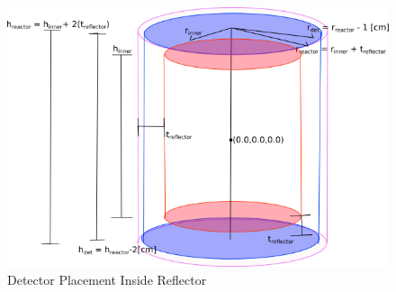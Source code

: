 \begin{figure}[h!]
\centering
\includegraphics{figures/detector-layout.png}
\caption{Detector Placement Inside Reflector}
\label{fig:det-place}
\end{figure}